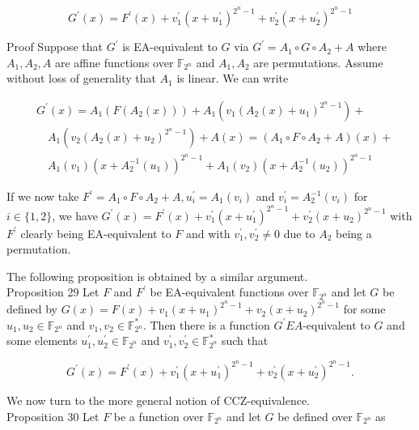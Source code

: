 \documentclass[10pt]{article}
\begin{document}
$$
G^{\prime}(x)=F^{\prime}(x)+v_{1}^{\prime}\left(x+u_{1}^{\prime}\right)^{2^{n}-1}+v_{2}^{\prime}\left(x+u_{2}^{\prime}\right)^{2^{n}-1}
$$

Proof Suppose that $G^{\prime}$ is EA-equivalent to $G$ via $G^{\prime}=A_{1} \circ G \circ A_{2}+A$ where $A_{1}, A_{2}, A$ are affine functions over $\mathbb{F}_{2^{n}}$ and $A_{1}, A_{2}$ are permutations. Assume without loss of generality that $A_{1}$ is linear. We can write


\begin{align*}
& G^{\prime}(x)=A_{1}\left(F\left(A_{2}(x)\right)\right)+A_{1}\left(v_{1}\left(A_{2}(x)+u_{1}\right)^{2^{n}-1}\right)+ \\
& \quad A_{1}\left(v_{2}\left(A_{2}(x)+u_{2}\right)^{2^{n}-1}\right)+A(x)=\left(A_{1} \circ F \circ A_{2}+A\right)(x)+ \\
& \quad A_{1}\left(v_{1}\right)\left(x+A_{2}^{-1}\left(u_{1}\right)\right)^{2^{n}-1}+A_{1}\left(v_{2}\right)\left(x+A_{2}^{-1}\left(u_{2}\right)\right)^{2^{n}-1} \tag{36}
\end{align*}


If we now take $F^{\prime}=A_{1} \circ F \circ A_{2}+A, u_{i}^{\prime}=A_{1}\left(v_{i}\right)$ and $v_{i}^{\prime}=A_{2}^{-1}\left(v_{i}\right)$ for $i \in\{1,2\}$, we have $G^{\prime}(x)=F^{\prime}(x)+v_{1}^{\prime}\left(x+u_{1}^{\prime}\right)^{2^{n}-1}+v_{2}^{\prime}\left(x+u_{2}\right)^{2^{n}-1}$ with $F^{\prime}$ clearly being EA-equivalent to $F$ and with $v_{1}^{\prime}, v_{2}^{\prime} \neq 0$ due to $A_{2}$ being a permutation.

The following proposition is obtained by a similar argument.\\
Proposition 29 Let $F$ and $F^{\prime}$ be EA-equivalent functions over $\mathbb{F}_{2^{n}}$ and let $G$ be defined by $G(x)=F(x)+v_{1}\left(x+u_{1}\right)^{2^{n}-1}+v_{2}\left(x+u_{2}\right)^{2^{n}-1}$ for some $u_{1}, u_{2} \in \mathbb{F}_{2^{n}}$ and $v_{1}, v_{2} \in \mathbb{F}_{2^{n}}^{*}$. Then there is a function $G^{\prime} E A$-equivalent to $G$ and some elements $u_{1}^{\prime}, u_{2}^{\prime} \in \mathbb{F}_{2^{n}}$ and $v_{1}^{\prime}, v_{2}^{\prime} \in \mathbb{F}_{2^{n}}^{*}$ such that

$$
G^{\prime}(x)=F^{\prime}(x)+v_{1}^{\prime}\left(x+u_{1}^{\prime}\right)^{2^{n}-1}+v_{2}^{\prime}\left(x+u_{2}^{\prime}\right)^{2^{n}-1} .
$$

We now turn to the more general notion of CCZ-equivalence.\\
Proposition 30 Let $F$ be a function over $\mathbb{F}_{2^{n}}$ and let $G$ be defined over $\mathbb{F}_{2^{n}}$ as
\end{document}
